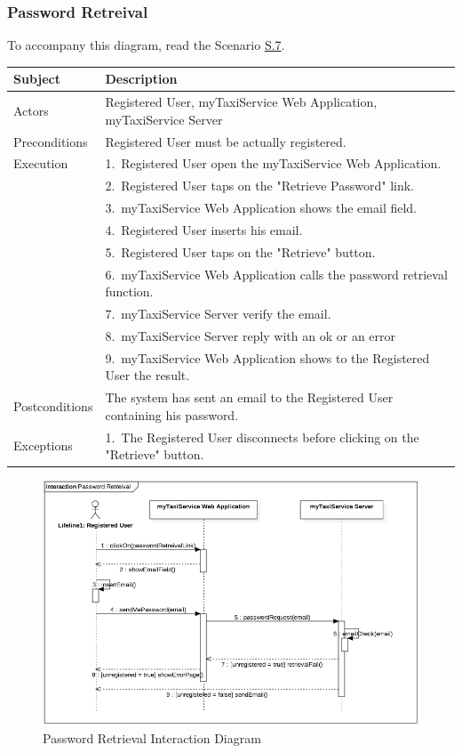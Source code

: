 \subsubsection{Password Retreival}
			To accompany this diagram, read the Scenario \hyperref[sec:PasswordRetrievalScenario]{S.7}.

				\begin{table}[htpb]
					\centering
					\label{tab:PasswordRetrievalDiagramTable}
					\begin{tabularx}{\textwidth}{lp{9cm}}
						\hline
						\hline
							\textbf{Subject}
						& 
							\textbf{Description}\\
						\hline
							Actors	       &  Registered User, myTaxiService Web Application, myTaxiService Server\\
						\hline
							Preconditions  &  Registered User must be actually registered.\\
						\hline
							Execution      &  1.~Registered User open the myTaxiService Web Application.\\
										   &  2.~Registered User taps on the "Retrieve Password" link.\\
										   &  3.~myTaxiService Web Application shows the email field.\\
										   &  4.~Registered User inserts his email.\\
										   &  5.~Registered User taps on the "Retrieve" button.\\
										   &  6.~myTaxiService Web Application calls the password retrieval function.\\
										   &  7.~myTaxiService Server verify the email.\\
										   &  8.~myTaxiService Server reply with an ok or an error\\
										   &  9.~myTaxiService Web Application shows to the Registered User the result.\\
						\hline
							Postconditions &  The system has sent an email to the Registered User containing his password.\\
						\hline
							Exceptions     &  1.~The Registered User disconnects before clicking on the "Retrieve" button.\\
									
						\hline
						\hline
					\end{tabularx}
				\end{table}
				
				\begin{figure}[H]
					\centering
					\includegraphics[width=\textwidth, scale=0.5]{IMG/InteractionDiagrams/PasswordRetrieval.png}
					\caption{Password Retrieval Interaction Diagram}\label{sec:FigureProfileModification}
				\end{figure}